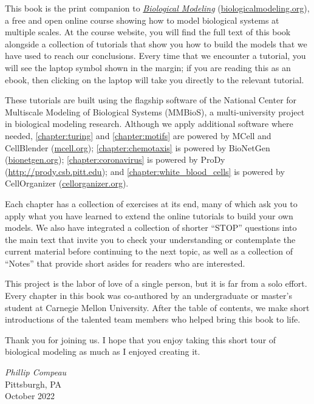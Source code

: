 This book is the print companion to \href{https://biologicalmodeling.org}{\textit{Biological Modeling}} (\href{https://biologicalmodeling.org}{biologicalmodeling.org}), a free and open online course showing how to model biological systems at multiple scales. At the course website, you will find the full text of this book alongside a collection of tutorials that show you how to build the models that we have used to reach our conclusions. Every time that we encounter a tutorial, you will see the laptop symbol shown in the margin; if you are reading this as an ebook, then clicking on the laptop will take you directly to the relevant tutorial.\tutorial[]

These tutorials are built using the flagship software of the National Center for Multiscale Modeling of Biological Systems (MMBioS), a multi-university project in biological modeling research. Although we apply additional software where needed, \autoref{chapter:turing} and \autoref{chapter:motifs} are powered by MCell and CellBlender (\url{mcell.org}); \autoref{chapter:chemotaxis} is powered by BioNetGen (\url{bionetgen.org}); \autoref{chapter:coronavirus} is powered by ProDy (\url{http://prody.csb.pitt.edu}); and \autoref{chapter:white_blood_cells} is powered by CellOrganizer (\url{cellorganizer.org}).

Each chapter has a collection of exercises at its end, many of which ask you to apply what you have learned to extend the online tutorials to build your own models. We  also have integrated a collection of shorter ``STOP'' questions into the main text that invite you to check your understanding or contemplate the current material before continuing to the next topic, as well as a collection of ``Notes'' that provide short asides for readers who are interested.

This project is the labor of love of a single person, but it is far from a solo effort. Every chapter in this book was co-authored by an undergraduate or master's student at Carnegie Mellon University. After the table of contents, we make short introductions of the talented team members who helped bring this book to life.

Thank you for joining us. I hope that you enjoy taking this short tour of biological modeling as much as I enjoyed creating it.

\begin{flushright}
\textit{Phillip Compeau}\\
{Pittsburgh, PA}\\
{October 2022}
\end{flushright}

